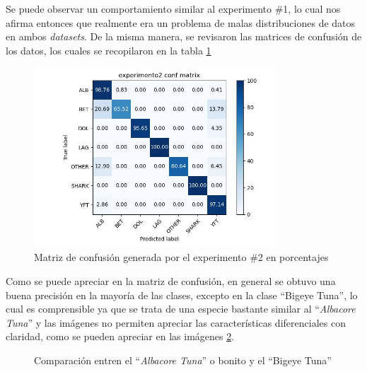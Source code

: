 Se puede observar un comportamiento similar al experimento \#1, lo cual nos afirma entonces que realmente era un problema de malas distribuciones de datos en ambos \textit{datasets}. De la misma manera, se revisaron las matrices de confusión de los datos, los cuales se recopilaron en la tabla \ref{fig:Matrix2}

\begin{figure}[h!]
\centering
\includegraphics[width=0.8\textwidth]{images/experimento2_conf_matrix.jpg}
\caption{Matriz de confusión generada por el experimento \#2 en porcentajes}
\label{fig:Matrix2}
\end{figure}

Como se puede apreciar en la matriz de confusión, en general se obtuvo una buena precisión en la mayoría de las clases, excepto en la clase ``Bigeye Tuna'', lo cual es comprensible ya que se trata de una especie bastante similar al ``\textit{Albacore Tuna}'' y las imágenes no permiten apreciar las características diferenciales con claridad, como se pueden apreciar en las imágenes \ref{fig:combined2}.

\begin{figure}[h!]%
    \centering
    \qquad
    \caption{Comparación entren el ``\textit{Albacore Tuna}'' o bonito y el ``Bigeye Tuna''}%
    \label{fig:combined2}%
\end{figure}

